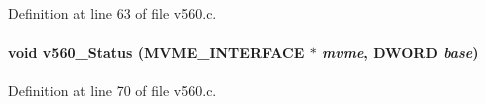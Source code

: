 Definition at line 63 of file v560.c.
\paragraph[{v560\_\-Status}]{\setlength{\rightskip}{0pt plus 5cm}void v560\_\-Status ({\bf MVME\_\-INTERFACE} $\ast$ {\em mvme}, \/  {\bf DWORD} {\em base})}\hfill\label{v560_8h_ac2004e54348a75af094e45a37b9d4be4}


Definition at line 70 of file v560.c.